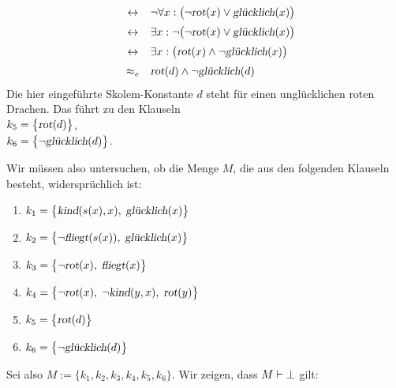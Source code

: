 \begin{enumerate}
$$\begin{array}{lcl}
         \\[0.2cm]
         & \leftrightarrow & \neg \forall x: \bigl(\neg \textsl{rot}(x) \vee \textsl{gl\"{u}cklich}(x) \bigr)
         \\[0.2cm]
         & \leftrightarrow & \exists x: \neg \bigl(\neg \textsl{rot}(x) \vee \textsl{gl\"{u}cklich}(x) \bigr)
         \\[0.2cm]
         & \leftrightarrow & \exists x: \bigl(\textsl{rot}(x) \wedge \neg \textsl{gl\"{u}cklich}(x) \bigr)
         \\[0.2cm]
         & \approx_e & \textsl{rot}(d) \wedge \neg \textsl{gl\"{u}cklich}(d) \\
        \end{array}
      $$
      Die hier eingef\"{u}hrte Skolem-Konstante $d$ steht f\"{u}r einen ungl\"{u}cklichen roten Drachen.
      Das f\"{u}hrt zu den Klauseln \\[0.2cm]
      \hspace*{1.3cm} $k_5 = \bigl\{ \textsl{rot}(d) \bigl\}$, \\[0.2cm]
      \hspace*{1.3cm} $k_6 = \bigl\{ \neg \textsl{gl\"{u}cklich}(d) \bigl\}$.
\end{enumerate}
Wir m\"{u}ssen also untersuchen, ob die Menge $M$, die aus den folgenden Klauseln besteht,
widerspr\"{u}chlich ist: 
\begin{enumerate}
\item $k_1 = \bigl\{ \textsl{kind}(s(x),x),\; \textsl{gl\"{u}cklich}(x) \bigl\}$  
\item $k_2 = \bigl\{ \neg \textsl{fliegt}(s(x)),\; \textsl{gl\"{u}cklich}(x) \bigl\}$
\item $k_3 = \bigl\{ \neg \textsl{rot}(x),\; \textsl{fliegt}(x) \bigl\}$
\item $k_4 = \bigl\{ \neg \textsl{rot}(x),\; \neg \textsl{kind}(y,x),\; \textsl{rot}(y) \bigl\}$
\item $k_5 = \bigl\{ \textsl{rot}(d) \bigl\}$ 
\item $k_6 = \bigl\{ \neg \textsl{gl\"{u}cklich}(d) \bigl\}$
\end{enumerate}
Sei also $M := \bigl\{k_1,k_2,k_3,k_4,k_5,k_6\bigl\}$.
Wir  zeigen, dass $M \vdash \bot$ gilt:
